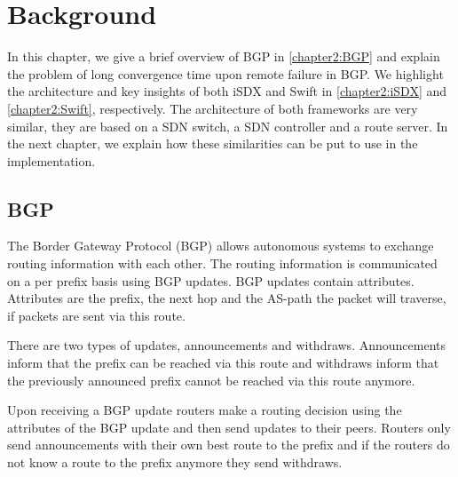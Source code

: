 
\chapter{\label{chapter2}Background}

In this chapter, we give a brief overview of BGP in \ref{chapter2:BGP} and explain the problem of long convergence time upon remote failure in BGP. We highlight the architecture and key insights of both iSDX and Swift in \ref{chapter2:iSDX} and \ref{chapter2:Swift}, respectively. The architecture of both frameworks are very similar, they are based on a SDN switch, a SDN controller and a route server. In the next chapter, we explain how these similarities can be put to use in the implementation.

\section{\label{chapter2:BGP}BGP}

The Border Gateway Protocol (BGP) allows autonomous systems to exchange routing information with each other. The routing information is communicated on a per prefix basis using BGP updates. BGP updates contain attributes. Attributes are the prefix, the next hop and the AS-path the packet will traverse, if packets are sent via this route. 

There are two types of updates, announcements and withdraws. Announcements inform that the prefix can be reached via this route and withdraws inform that the previously announced prefix cannot be reached via this route anymore. 

Upon receiving a BGP update routers make a routing decision using the attributes of the BGP update and then send updates to their peers. Routers only send announcements with their own best route to the prefix and if the routers do not know a route to the prefix anymore they send withdraws.

